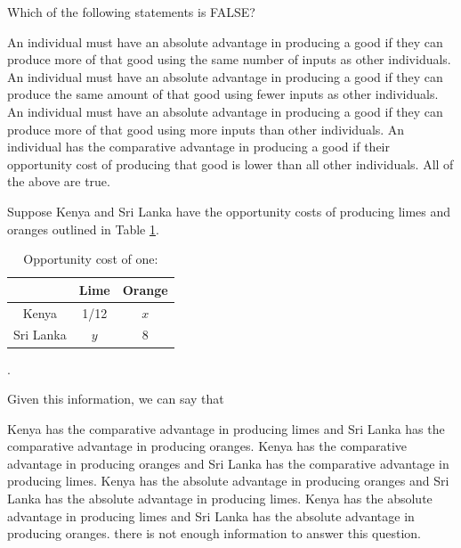 \documentclass[addpoints,11pt]{exam}
\theoremstyle{definition}
\begin{document}
\begin{questions}
\question Which of the following statements is FALSE?

\begin{choices}
	\choice An individual must have an absolute advantage in producing a good if they can produce more of that good using the same number of inputs as other individuals.
	\choice An individual must have an absolute advantage in producing a good if they can produce the same amount of that good using fewer inputs as other individuals.
	\CorrectChoice An individual must have an absolute advantage in producing a good if they can produce more of that good using more inputs than other individuals.
	\choice An individual has the comparative advantage in producing a good if their opportunity cost of producing that good is lower than all other individuals.
	\choice All of the above are true.
\end{choices}


\question Suppose Kenya and Sri Lanka have the opportunity costs of producing limes and oranges outlined in  Table \ref{blah}. 

\begin{table}[H]
\caption{Opportunity cost of one:}
\centering
\begin{tabular}{ c|c|c} 
	
	& Lime & Orange \\
	\hline
	Kenya & 1/12 & $x$  \\
	Sri Lanka & $y$  & 8  \\
\end{tabular}
\label{blah}
\end{table}.

Given this information, we can say that

\begin{choices}
	\CorrectChoice Kenya has the comparative advantage in producing limes and Sri Lanka has the comparative advantage in producing oranges.
	\choice Kenya has the comparative advantage in producing oranges and Sri Lanka has the comparative advantage in producing limes.
	\choice Kenya has the absolute advantage in producing oranges and Sri Lanka has the absolute advantage in producing limes.
	\choice Kenya has the absolute advantage in producing limes and Sri Lanka has the absolute advantage in producing oranges.
	\choice there is not enough information to answer this question.
\end{choices}




\end{questions}
\end{document}
